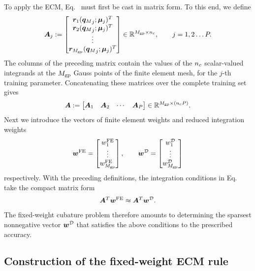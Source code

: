 \documentclass[preprint,10pt]{elsarticle}  %
\begin{document}
To apply the ECM, Eq.~ must first be cast in matrix
form. To this end, we   define
\begin{equation}
\label{eq:Agen_j_definition}
\bm{A}_j
:=
\begin{bmatrix}
\bm{r}_{1}({\bm{q}_M}_j;\bm{\mu}_j)^T\\
\bm{r}_{2}({\bm{q}_M}_j;\bm{\mu}_j)^T\\
\vdots\\
\bm{r}_{M_{\mathrm{gp}}}({\bm{q}_M}_j;\bm{\mu}_j)^T
\end{bmatrix}
\in\mathbb{R}^{M_{\mathrm{gp}}\times n_c}, \qquad  j = 1,2 \ldots P.
\end{equation}
The columns of the preceding matrix contain the values of the \(n_c\)
scalar-valued integrands at the \(M_{\mathrm{gp}}\) Gauss points of the finite
element mesh, for the $j$-th training parameter.
Concatenating these matrices over the complete training
set gives
\begin{equation}
\label{eq:AgenDEF}
\bm{A}
:=
\begin{bmatrix}
\bm{A}_1 &
\bm{A}_2 &
\cdots &
\bm{A}_{P}
\end{bmatrix}
\in
\mathbb{R}^{M_{\mathrm{gp}}\times(n_cP)}.
\end{equation}
Next we introduce the vectors of  finite element weights and reduced integration weights
\begin{equation}
\label{eq:weight_vectors_fixed_ECM}
\bm{w}^{\mathrm{FE}}
=
\begin{bmatrix}
w^{\mathrm{FE}}_{1}\\
\vdots\\
w^{\mathrm{FE}}_{M_{\mathrm{gp}}}
\end{bmatrix},
\qquad
\bm{w}^{\mathcal{D}}
=
\begin{bmatrix}
w^{\mathcal{D}}_{1}\\
\vdots\\
w^{\mathcal{D}}_{M_{\mathrm{gp}}}
\end{bmatrix}
\end{equation}
respectively. With the preceding definitions, the
integration conditions in Eq.~ take the compact
matrix form
\begin{equation}
\label{eq:fixed_cubature_sampled_conditions}
\bm{A}^T\bm{w}^{\mathrm{FE}}
\approx
\bm{A}^T\bm{w}^{\mathcal{D}}.
\end{equation}
 The fixed-weight cubature problem therefore amounts to determining the
sparsest nonnegative vector \(\bm{w}^{\mathcal{D}}\) that satisfies the above conditions
to the prescribed accuracy.




\subsection{Construction of the fixed-weight ECM rule}
\label{sec:fixed_weight_cubature}
\end{document}
